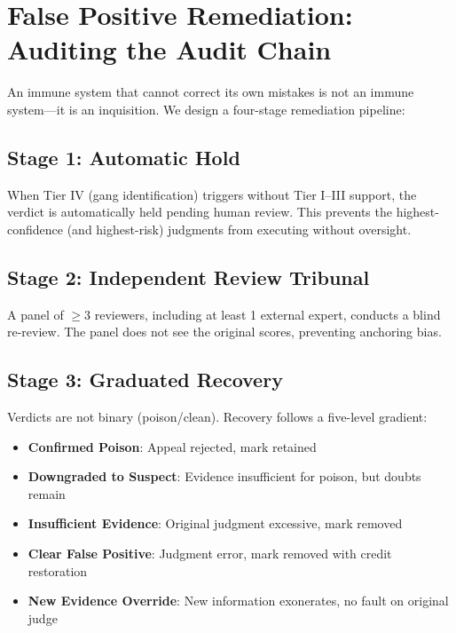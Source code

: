 \documentclass[11pt]{article}
\begin{document}



\section{False Positive Remediation: Auditing the Audit Chain}

An immune system that cannot correct its own mistakes is not an immune system---it is 
an inquisition. We design a four-stage remediation pipeline:

\subsection{Stage 1: Automatic Hold}
When Tier IV (gang identification) triggers without Tier I--III support, the verdict 
is automatically held pending human review. This prevents the highest-confidence 
(and highest-risk) judgments from executing without oversight.

\subsection{Stage 2: Independent Review Tribunal}
A panel of $\geq 3$ reviewers, including at least 1 external expert, conducts a blind 
re-review. The panel does not see the original scores, preventing anchoring bias.

\subsection{Stage 3: Graduated Recovery}
Verdicts are not binary (poison/clean). Recovery follows a five-level gradient:
\begin{itemize}
  \item \textbf{Confirmed Poison}: Appeal rejected, mark retained
  \item \textbf{Downgraded to Suspect}: Evidence insufficient for poison, but doubts remain
  \item \textbf{Insufficient Evidence}: Original judgment excessive, mark removed
  \item \textbf{Clear False Positive}: Judgment error, mark removed with credit restoration
  \item \textbf{New Evidence Override}: New information exonerates, no fault on original judge
\end{itemize}
\end{document}
